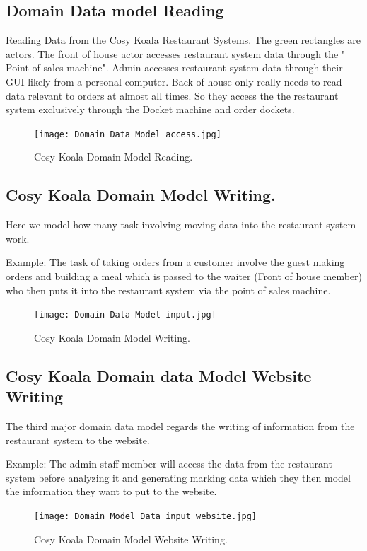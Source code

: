 \documentclass{article}
\begin{document}
\clearpage
\subsection{ Domain Data model Reading}
Reading Data from the Cosy Koala Restaurant Systems. The green rectangles are actors.
The front of house actor accesses restaurant system data through the " Point of sales machine".
Admin accesses restaurant system data through their GUI likely from a personal computer.
Back of house only really needs to read data relevant to orders at almost all times. So they access the the restaurant system exclusively through the Docket machine and order dockets.

\begin{figure}[!ht]
    \centering
    \texttt{[image: Domain Data Model access.jpg]}
    \caption{Cosy Koala Domain Model Reading.}
    \label{fig:Domain_Model_access}
\end{figure}

\clearpage
\subsection{Cosy Koala Domain Model Writing.}
Here we model how many task involving moving data into the restaurant system work.

Example: The task of taking orders from a customer involve the guest making orders and building a meal which is passed to the waiter (Front of house member) who then puts it into the restaurant system via the point of sales machine.
\begin{figure}[!ht]
    \centering
    \texttt{[image: Domain Data Model input.jpg]}
    \caption{Cosy Koala Domain Model Writing.}
    \label{fig:Domain_Model_input}
\end{figure}

\clearpage
\subsection{Cosy Koala Domain data Model Website Writing}
The third major domain data model regards the writing of information from the restaurant system to the website.

Example: The admin staff member will access the data from the restaurant system before analyzing it and generating marking data which they then model the information they want to put to the website.
\begin{figure}[!ht]
    \centering
    \texttt{[image: Domain Model Data input website.jpg]}
    \caption{Cosy Koala Domain Model Website Writing.}
    \label{fig:Domain_Model_website}
\end{figure}
\end{document}
